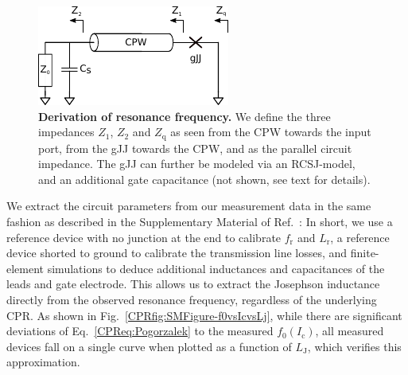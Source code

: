 \begin{figure}
	\centering
	\includegraphics[width=0.5\linewidth]{chapter-gJJ-CPR/figs/rfderivation}
	\caption{
		\textbf{Derivation of resonance frequency.}
		We define the three impedances $Z_1$, $Z_2$ and $Z_\text{q}$ as seen from the CPW towards the input port, from the gJJ towards the CPW, and as the parallel circuit impedance.
		The gJJ can further be modeled via an RCSJ-model, and an additional gate capacitance (not shown, see text for details).
	}
	\label{CPRfig:rfderivation}
\end{figure}


We extract the circuit parameters from our measurement data in the same fashion as described in the Supplementary Material of Ref.~\cite{schmidtBallisticGrapheneSuperconducting2018}:
%
In short, we use a reference device with no junction at the end to calibrate $f_\text{r}$ and $L_\text{r}$, a reference device shorted to ground to calibrate the transmission line losses, and finite-element simulations to deduce additional inductances and capacitances of the leads and gate electrode.
%
This allows us to extract the Josephson inductance directly from the observed resonance frequency, regardless of the underlying CPR.
%
As shown in Fig.~\ref{CPRfig:SMFigure-f0vsIcvsLj}, while there are significant deviations of Eq.~\ref{CPReq:Pogorzalek} to the measured $f_0(I_\text{c})$, all measured devices fall on a single curve when plotted as a function of $L_\text{J}$, which verifies this approximation.

